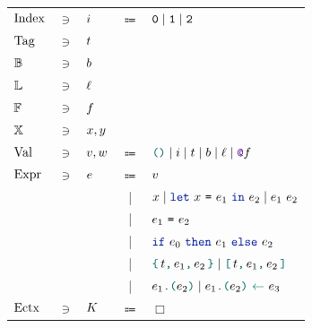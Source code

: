 \begin{figure}[tp]
    \begin{tabular}{lclcl}
            $\datalangIdx[]$
            & $\ni$ &
            $\datalangIdx$
            & $\Coloneqq$ &
            $\texttt{0} \mid \texttt{1} \mid \texttt{2}$
        \\
            $\datalangTag[]$
            & $\ni$ &
            $\datalangTag$
        \\
            $\datalangBool[]$
            & $\ni$ &
            $\datalangBool$
    	\\
    		$\datalangLoc[]$
    		& $\ni$ &
    		$\datalangLoc$
        \\
            $\datalangFn[]$
            & $\ni$ &
            $\datalangFn$
        \\
            $\datalangVar[]$
            & $\ni$ &
            $\datalangVar, \datalangVarTwo$
    	\\
            $\datalangVal[]$
            & $\ni$ &
            $\datalangVal, \datalangValTwo$
            & $\Coloneqq$ &
            $\datalangUnit \mid \datalangIdx \mid \datalangTag \mid \datalangBool \mid \datalangLoc \mid \datalangFnptr{\datalangFn}$
        \\
            $\datalangExpr[]$
            & $\ni$ &
            $\datalangExpr$
            & $\Coloneqq$ &
            $\datalangVal$
        \\
            &&
            & | &
            $\datalangVar \mid \datalangLet{\datalangVar}{\datalangExpr_1}{\datalangExpr_2} \mid \datalangCall{\datalangExpr_1}{\datalangExpr_2}$
        \\
            &&
            & | &
            $\datalangEq{\datalangExpr_1}{\datalangExpr_2}$
        \\
            &&
            & | &
            $\datalangIf{\datalangExpr_0}{\datalangExpr_1}{\datalangExpr_2}$
        \\
            &&
            & | &
            $\datalangBlock{\datalangTag}{\datalangExpr_1}{\datalangExpr_2} \mid \datalangBlockDet{\datalangTag}{\datalangExpr_1}{\datalangExpr_2}$
        \\
            &&
            & | &
            $\datalangLoad{\datalangExpr_1}{\datalangExpr_2} \mid \datalangStore{\datalangExpr_1}{\datalangExpr_2}{\datalangExpr_3}$
        \\
            $\datalangEctx[]$
            & $\ni$ &
            $\datalangEctx$
            & $\Coloneqq$ &
            $\Box$
        \\

\end{tabular}
\end{figure}
